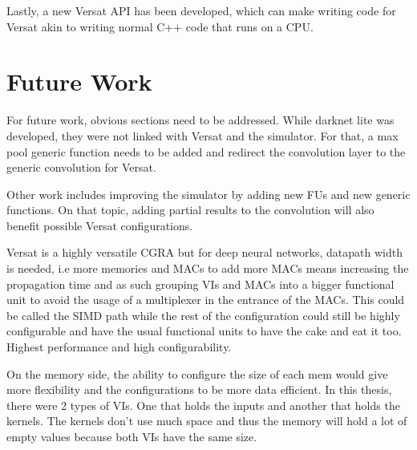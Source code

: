 Lastly, a new Versat API has been developed, which can make writing code for
Versat akin to writing normal C++ code that runs on a CPU.


\section{Future Work}
\label{section:future}

For future work, obvious sections need to be addressed. While darknet lite was developed,
they were not linked with Versat and the simulator. For that, a max pool generic function
needs to be added and redirect the convolution layer to the generic convolution for Versat.

Other work includes improving the simulator by adding new FUs and new generic functions. On that
topic, adding partial results to the convolution will also benefit possible Versat configurations.

Versat is a highly versatile CGRA but for deep neural networks, datapath width is needed, i.e
more memories and MACs to add more MACs means increasing the propagation time and as such
grouping VIs and MACs into a bigger functional unit to avoid the usage of a multiplexer
in the entrance of the MACs. This could be called the SIMD path while the rest of the configuration
could still be highly configurable and have the usual functional units to have the cake and eat it too.
Highest performance and high configurability.

On the memory side, the ability to configure the size of each mem would give more flexibility
and the configurations to be more data efficient. In this thesis, there were 2 types of VIs. One
that holds the inputs and another that holds the kernels. The kernels don't use much space and thus
the memory will hold a lot of empty values because both VIs have the same size.


